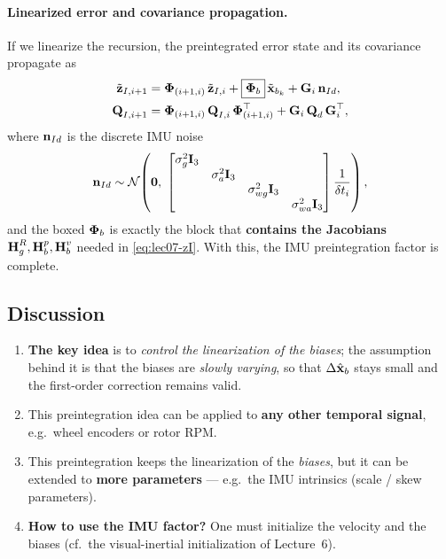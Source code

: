 \paragraph{Linearized error and covariance propagation.} If we linearize the recursion, the preintegrated error state and its covariance propagate as
\begin{align}
\tilde{\boldsymbol{\mathbf{z}}}_{I,i+1} &= \boldsymbol{\mathbf{\Phi}}_{(i+1,i)}\,\tilde{\boldsymbol{\mathbf{z}}}_{I,i} + \boxed{\boldsymbol{\mathbf{\Phi}}_b}\,\tilde{\boldsymbol{\mathbf{x}}}_{b_k} + \boldsymbol{\mathbf{G}}_i\,\boldsymbol{\mathbf{n}}_{Id}, \\
\boldsymbol{\mathbf{Q}}_{I,i+1} &= \boldsymbol{\mathbf{\Phi}}_{(i+1,i)}\,\boldsymbol{\mathbf{Q}}_{I,i}\,\boldsymbol{\mathbf{\Phi}}_{(i+1,i)}^\top + \boldsymbol{\mathbf{G}}_i\,\boldsymbol{\mathbf{Q}}_d\,\boldsymbol{\mathbf{G}}_i^\top,
\end{align}
where $\boldsymbol{\mathbf{n}}_{Id}$ is the discrete IMU noise
\begin{align}
\boldsymbol{\mathbf{n}}_{Id} \sim \mathcal{N}\!\left(\boldsymbol{\mathbf{0}},\;
\begin{bmatrix}
\sigma_g^2\boldsymbol{\mathbf{I}}_3 & & & \\
& \sigma_a^2\boldsymbol{\mathbf{I}}_3 & & \\
& & \sigma_{wg}^2\boldsymbol{\mathbf{I}}_3 & \\
& & & \sigma_{wa}^2\boldsymbol{\mathbf{I}}_3
\end{bmatrix}\frac{1}{\delta t_i}\right),
\end{align}
and the boxed $\boldsymbol{\mathbf{\Phi}}_b$ is exactly the block that \textbf{contains the Jacobians} $\boldsymbol{\mathbf{H}}_g^R, \boldsymbol{\mathbf{H}}_b^p, \boldsymbol{\mathbf{H}}_b^v$ needed in \eqref{eq:lec07-zI}. With this, the IMU preintegration factor is complete.

\subsection{Discussion}
\label{sec:lec07-discussion}

\begin{enumerate}[topsep=3pt]
\item \textbf{The key idea} is to \emph{control the linearization of the biases}; the assumption behind it is that the biases are \emph{slowly varying}, so that $\Delta\hat{\boldsymbol{\mathbf{x}}}_b$ stays small and the first-order correction remains valid.
\item This preintegration idea can be applied to \textbf{any other temporal signal}, e.g.\ wheel encoders or rotor RPM.
\item This preintegration keeps the linearization of the \emph{biases}, but it can be extended to \textbf{more parameters} --- e.g.\ the IMU intrinsics (scale / skew parameters).
\item \textbf{How to use the IMU factor?} One must initialize the velocity and the biases (cf.\ the visual-inertial initialization of Lecture~6).
\end{enumerate}

